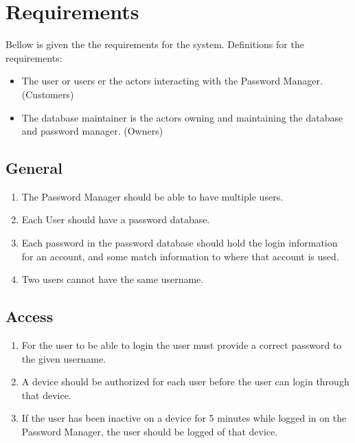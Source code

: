 \chapter{Requirements}
Bellow is given the the requirements for the system. Definitions for the requirements:
\begin{itemize}
    \item The user or users er the actors interacting with the Password Manager. (Customers)
    \item The database maintainer is the actors owning and maintaining the database and password manager. (Owners)
\end{itemize}

\section{General}
\begin{enumerate}[label={\textbf{Req. \arabic*}}, ref={req. \arabic*}]
    \item The Password Manager should be able to have multiple users.
    \item Each User should have a password database.
    \item Each password in the password database should hold the login information for an account, and some match information to where that account is used.
    \item Two users cannot have the same username.

\end{enumerate}
\section{Access}
\begin{enumerate}[resume*]

    \item For the user to be able to login the user must provide a correct password to the given username.
    \item A device should be authorized for each user before the user can login through that device.
    \item If the user has been inactive on a device for 5 minutes while logged in on the Password Manager, the user should be logged of that device. \label{bul:req:inactive}

\end{enumerate}

